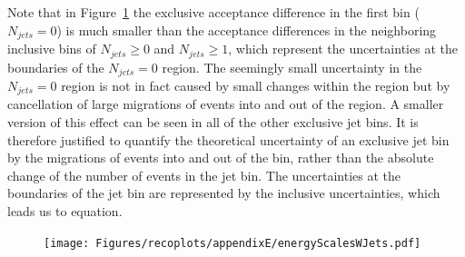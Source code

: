\documentclass[oneside, letterpaper, oldfontcommands]{memoir}
\begin{document}
{{{\qqaud Note that in Figure~\ref{fig:acceptances} the exclusive acceptance difference in the first bin ($N_{jets}=0$) is much smaller than the acceptance differences in the neighboring inclusive bins of $N_{jets} \geq 0$ and $N_{jets} \geq 1$, which represent the uncertainties at the boundaries of the $N_{jets}=0$ region. The seemingly small uncertainty in the $N_{jets}=0$ region is not in fact caused by small changes within the region but by cancellation of large migrations of events into and out of the region. A smaller version of this effect can be seen in all of the other exclusive jet bins.
It is therefore justified to quantify the theoretical uncertainty of an exclusive jet bin by the migrations of events into and out of the bin, rather than the absolute change of the number of events in the jet bin. The uncertainties at the boundaries of the jet bin are represented by the inclusive uncertainties, which leads us to equation.



\begin{table}[hbtp]
 \centering  {}
  \label{tab:JetUncTable}
\end{table}

\begin{figure}[hbt]\centering
\texttt{[image: Figures/recoplots/appendixE/energyScalesWJets.pdf]}
 \centering {}
 \label{fig:acceptances}\end{figure}
 
}}}
\end{document}
